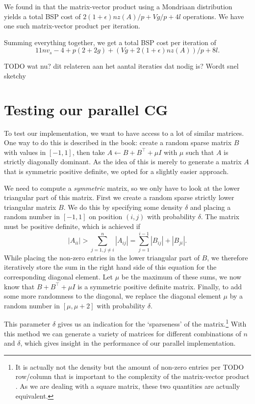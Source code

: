 \documentclass[11pt]{amsart}
\theoremstyle{definition}
\begin{document}
We found in \cite[p.~189]{biss04} that the matrix-vector product using a Mondriaan distribution yields a total BSP cost of $2(1+\epsilon)nz(A)/p + Vg/p + 4l$ operations. We have one such matrix-vector product per iteration.

Summing everything together, we get a total BSP cost per iteration of
\[
  11nv_s - 4 + p(2+2g) + (Vg + 2 (1+\epsilon)nz(A))/p + 8l.
\]

TODO wat nu? dit relateren aan het aantal iteraties dat nodig is? Wordt snel sketchy

\section{Testing our parallel CG}
To test our implementation, we want to have access to a lot of similar matrices. One way to do this is described in the book: create a random sparse matrix $B$ with values in $[-1,1]$, then take $A \gets B + B^\top + \mu I$ with $\mu$ such that $A$ is strictly diagonally dominant. As the idea of this is merely to generate a matrix $A$ that is symmetric positive definite, we opted for a slightly easier approach. 

We need to compute a \emph{symmetric} matrix, so we only have to look at the lower triangular part of this matrix. First we create a 
random sparse strictly lower triangular matrix $B$. We do this by specifying some
density $\delta$ and placing a random number in $[-1,1]$ on position $(i,j)$ with probability $\delta$. The matrix
must be positive definite, which is achieved \cite[Ex.~24.2]{trefbau} if
\[
  |A_{ii}| > \sum_{j=1, j\ne i}^n |A_{ij}|= \sum_{j=1}^{i-1} |B_{ij}| + |B_{ji}|.
\]
While placing the non-zero entries in the lower triangular part of $B$, we therefore iteratively store the sum in the right hand side of this equation for the
corresponding diagonal element. Let $\mu$ be the maximum of these sums, we now know that $B + B^\top + \mu I$ is a symmetric
positive definite matrix. Finally, to add some more randomness to the diagonal, we replace the diagonal element $\mu$ by a random number in $[\mu, \mu + 2]$ with probability $\delta$.

This parameter $\delta$ gives us an indication for the `sparseness' of the matrix.\footnote{It is actually not the density but the amount of non-zero entries per TODO row/column that is important to the complexity of the matrix-vector product \cite[p.~178]{biss04}. As we are dealing with a square matrix, these two quantities are actually equivalent.} With this method we can generate a variety of matrices
for different combinations of $n$ and $\delta$, which gives insight in the performance of our parallel implementation.
\end{document}
